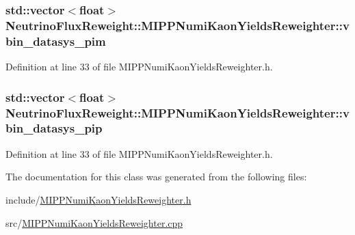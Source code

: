 \hypertarget{class_neutrino_flux_reweight_1_1_m_i_p_p_numi_kaon_yields_reweighter_a1c50c5dbfbf3688e4034dead330d83db}{
\subsubsection[{vbin\-\_\-datasys\-\_\-pim}]{\setlength{\rightskip}{0pt plus 5cm}std\-::vector$<$float$>$ Neutrino\-Flux\-Reweight\-::\-M\-I\-P\-P\-Numi\-Kaon\-Yields\-Reweighter\-::vbin\-\_\-datasys\-\_\-pim\hspace{0.3cm}{\ttfamily [private]}}}\label{class_neutrino_flux_reweight_1_1_m_i_p_p_numi_kaon_yields_reweighter_a1c50c5dbfbf3688e4034dead330d83db}


Definition at line 33 of file M\-I\-P\-P\-Numi\-Kaon\-Yields\-Reweighter.\-h.

\hypertarget{class_neutrino_flux_reweight_1_1_m_i_p_p_numi_kaon_yields_reweighter_a852ed8a2467fade867ca8abe0d0b3037}{
\subsubsection[{vbin\-\_\-datasys\-\_\-pip}]{\setlength{\rightskip}{0pt plus 5cm}std\-::vector$<$float$>$ Neutrino\-Flux\-Reweight\-::\-M\-I\-P\-P\-Numi\-Kaon\-Yields\-Reweighter\-::vbin\-\_\-datasys\-\_\-pip\hspace{0.3cm}{\ttfamily [private]}}}\label{class_neutrino_flux_reweight_1_1_m_i_p_p_numi_kaon_yields_reweighter_a852ed8a2467fade867ca8abe0d0b3037}


Definition at line 33 of file M\-I\-P\-P\-Numi\-Kaon\-Yields\-Reweighter.\-h.



The documentation for this class was generated from the following files\-:\begin{DoxyCompactItemize}
\item 
include/\hyperlink{_m_i_p_p_numi_kaon_yields_reweighter_8h}{M\-I\-P\-P\-Numi\-Kaon\-Yields\-Reweighter.\-h}\item 
src/\hyperlink{_m_i_p_p_numi_kaon_yields_reweighter_8cpp}{M\-I\-P\-P\-Numi\-Kaon\-Yields\-Reweighter.\-cpp}\end{DoxyCompactItemize}

